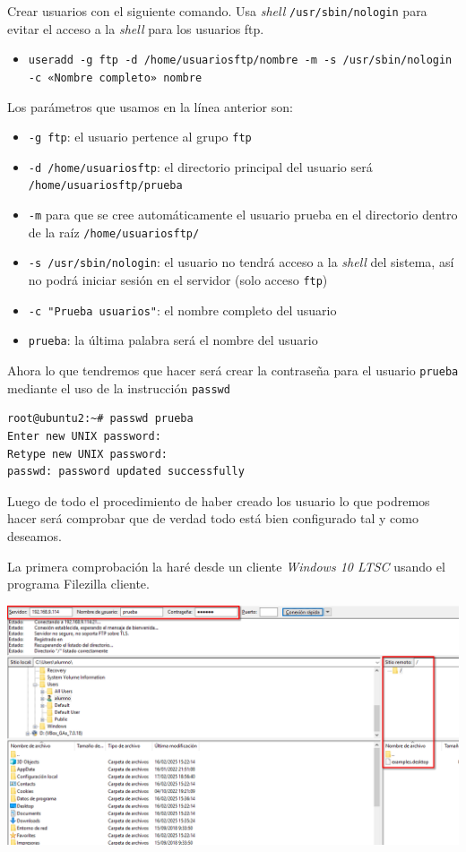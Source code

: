 \documentclass[11pt]{article}
\begin{document}
Crear usuarios con el siguiente comando. Usa \emph{shell} \texttt{/usr/sbin/nologin} para evitar el acceso a la \emph{shell} para los usuarios ftp.

\begin{itemize}
\item \texttt{useradd -g ftp -d /home/usuariosftp/nombre  -m -s /usr/sbin/nologin -c «Nombre completo» nombre}
\end{itemize}

Los parámetros que usamos en la línea anterior son:
\begin{itemize}
\item \texttt{-g ftp}: el usuario pertence al grupo \texttt{ftp}
\item \texttt{-d /home/usuariosftp}: el directorio principal del usuario será \texttt{/home/usuariosftp/prueba}
\item \texttt{-m} para que se cree automáticamente el usuario prueba en el directorio dentro de la raíz \texttt{/home/usuariosftp/}
\item \texttt{-s /usr/sbin/nologin}: el usuario no tendrá acceso a la \emph{shell} del sistema, así no podrá iniciar sesión en el servidor (solo acceso \texttt{ftp})
\item \texttt{-c "Prueba usuarios"}: el nombre completo del usuario
\item \texttt{prueba}: la última palabra será el nombre del usuario
\end{itemize}


Ahora lo que tendremos que hacer será crear la contraseña para el usuario \texttt{prueba} mediante el uso de la instrucción \texttt{passwd}
\begin{verbatim}
root@ubuntu2:~# passwd prueba
Enter new UNIX password: 
Retype new UNIX password: 
passwd: password updated successfully
\end{verbatim}

Luego de todo el procedimiento de haber creado los usuario lo que podremos hacer será comprobar que de verdad todo está bien configurado tal y como deseamos.

La primera comprobación la haré desde un cliente \emph{Windows 10 LTSC} usando el programa Filezilla cliente.

\begin{center}
\includegraphics[width=.9\linewidth]{./media/ftp-2.png}
\end{center}
\end{document}
